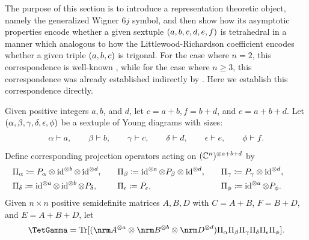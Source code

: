 \documentclass[notitlepage, 10pt]{article}
\begin{document}
The purpose of this section is to introduce a representation theoretic object, namely the generalized Wigner $6j$ symbol, and then show how its asymptotic properties encode whether a given sextuple $(a,b,c,d,e,f)$ is tetrahedral in a manner which analogous to how the Littlewood-Richardson coefficient encodes whether a given triple $(a,b,c)$ is trigonal.
For the case where $n=2$, this correspondence is well-known \cite{roberts1999classical,ponzano1968semiclassical,backens2010sixjsymbols}, while for the case where $n \geq 3$, this correspondence was already established indirectly by \citeauthor{christandl2018recoupling} \cite{christandl2018recoupling}.
Here we establish this correspondence directly.

\begin{defn}
    \label{defn:tet_gamma}
    Given positive integers $a,b$, and $d$, let $c=a+b,f=b+d$, and $e=a+b+d$.
    Let $(\alpha, \beta, \gamma, \delta, \epsilon, \phi)$ be a sextuple of Young diagrams with sizes:
    \begin{equation}
        \label{eq:six_yd_sizes}
        \alpha \vdash a, \qquad 
        \beta \vdash b, \qquad
        \gamma \vdash c, \qquad
        \delta \vdash d, \qquad
        \epsilon \vdash e, \qquad
        \phi \vdash f.
    \end{equation}
    Define corresponding projection operators acting on $(\mathbb C^{n})^{\otimes a+b+d}$ by
    \begin{equation}
        \label{eq:tet_extended_projs}
        \begin{alignedat}{3}
            &\Pi_{\alpha} \coloneqq P_{\alpha} \otimes \operatorname{id}^{\otimes b} \otimes \operatorname{id}^{\otimes d}, \qquad 
            &&\Pi_{\beta} \coloneqq \operatorname{id}^{\otimes a} \otimes P_{\beta} \otimes \operatorname{id}^{\otimes d}, \qquad
            &&\Pi_{\gamma} \coloneqq P_{\gamma} \otimes \operatorname{id}^{\otimes d}, \qquad\\
             &\Pi_{\delta} \coloneqq \operatorname{id}^{\otimes a} \otimes \operatorname{id}^{\otimes b} \otimes P_{\delta}, \qquad
            &&\Pi_{\epsilon} \coloneqq P_{\epsilon}, \qquad
            &&\Pi_{\phi} \coloneqq \operatorname{id}^{\otimes a} \otimes P_{\phi}.
        \end{alignedat}
    \end{equation}
    Given $n\times n$ positive semidefinite matrices $A,B,D$ with $C=A+B$, $F=B+D$, and $E=A+B+D$, let
    \begin{equation}
        \TetGamma 
        = \Tr[(\nrm A^{\ot a} \ot \nrm B^{\ot b} \ot \nrm D^{\ot d}) \Pi_{\ya}\Pi_{\yb}\Pi_{\yc}\Pi_{\yd}\Pi_{\ye}\Pi_{\yf}].
    \end{equation}
\end{defn}
\end{document}
